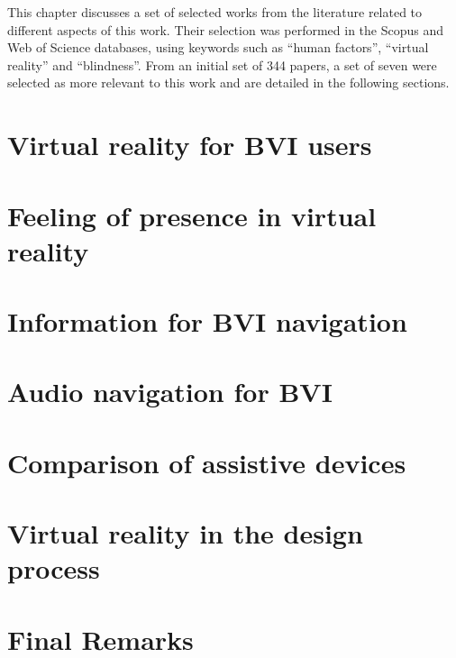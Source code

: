 This chapter discusses a set of selected works from the literature related to different aspects of this work. Their selection was performed in the Scopus and Web of Science databases, using keywords such as “human factors”, “virtual reality” and “blindness”. From an initial set of 344 papers, a set of seven were selected as more relevant to this work and are detailed in the following sections.

\section{Virtual reality for BVI users}
\label{sec:vr_without_vision}


\section{Feeling of presence in virtual reality}
\label{sec:emotion_presence_vr}


\section{Information for BVI navigation}
\label{sec:bradley_dunlop}


\section{Audio navigation for BVI}
\label{sec:auditory_navigation}


\section{Comparison of assistive devices}
\label{sec:evaluation_spatial_display}


\section{Virtual reality in the design process}
\label{sec:vr_cabin}


\section{Final Remarks}
\label{sec:final_remarks3}

